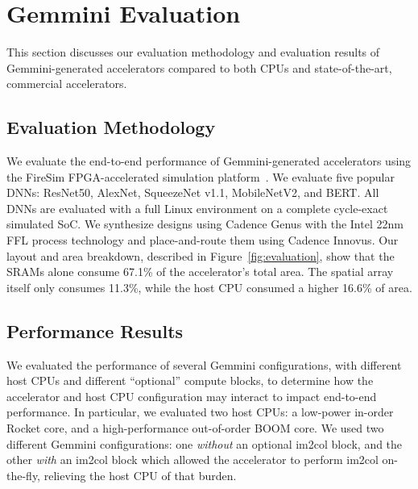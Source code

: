 \section{Gemmini Evaluation}\label{sec:evaluation}
This section discusses our evaluation methodology and evaluation results of Gemmini-generated accelerators compared to both CPUs and state-of-the-art, commercial accelerators.

\subsection{Evaluation Methodology}

We evaluate the end-to-end performance of Gemmini-generated accelerators using the FireSim FPGA-accelerated simulation platform~\cite{karandikar2018firesim}. We evaluate five popular DNNs: ResNet50, AlexNet, SqueezeNet v1.1, MobileNetV2, and BERT.
All DNNs are evaluated with a full Linux environment on a complete cycle-exact simulated SoC.
We synthesize designs using Cadence Genus with the Intel 22nm FFL process technology and place-and-route them using Cadence Innovus.
Our layout and area breakdown, described in Figure~\ref{fig:evaluation}, show that the SRAMs alone consume 67.1\% of the accelerator's total area. The spatial array itself only consumes 11.3\%, while the host CPU consumed a higher 16.6\% of area.


\subsection{Performance Results}

We evaluated the performance of several Gemmini configurations, with different host CPUs and different ``optional'' compute blocks, to determine how the accelerator and host CPU configuration may interact to impact end-to-end performance. In particular, we evaluated two host CPUs: a low-power in-order Rocket core, and a high-performance out-of-order BOOM core. We used two different Gemmini configurations:
one \textit{without} an optional im2col block, and the other \textit{with} an im2col block which allowed the accelerator to perform im2col on-the-fly, relieving the host CPU of that burden.

